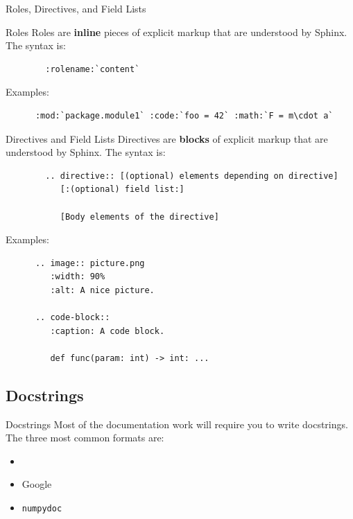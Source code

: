 \begin{frame}[fragile]{
    Roles, Directives, and Field Lists
    \hfill
  }
  \begin{block}{Roles}
    Roles are \textbf{inline} pieces of explicit markup that are understood by Sphinx.
    The syntax is:
    \begin{center}
      \begin{verbatim}
        :rolename:`content`
      \end{verbatim}
    \end{center}

    Examples:
    \begin{verbatim}
      :mod:`package.module1` :code:`foo = 42` :math:`F = m\cdot a`
    \end{verbatim}
  \end{block}
  \begin{block}{Directives and Field Lists}
    Directives are \textbf{blocks} of explicit markup that are understood by Sphinx.
    The syntax is:
    \begin{center}
      \footnotesize
      \begin{verbatim}
        .. directive:: [(optional) elements depending on directive]
           [:(optional) field list:]

           [Body elements of the directive]
      \end{verbatim}
    \end{center}

    Examples:
    \footnotesize
    \begin{verbatim}
      .. image:: picture.png
         :width: 90%
         :alt: A nice picture.

      .. code-block::
         :caption: A code block.

         def func(param: int) -> int: ...
    \end{verbatim}
  \end{block}

\end{frame}

\subsection{Docstrings}
\begin{frame}[fragile]{Docstrings}
  Most of the documentation work will require you to write docstrings. The three most common
  formats are:
  \begin{itemize}
    \item \reST
    \item Google
    \item \texttt{numpydoc}
  \end{itemize}
\end{frame}

